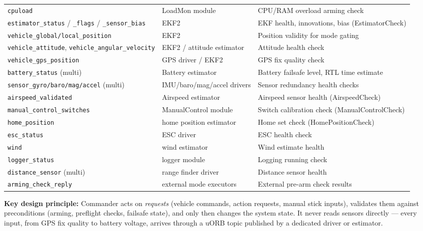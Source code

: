 \documentclass[12pt,a4paper]{article}
\begin{document}
\begin{center}
\begin{tabular}{p{4.5cm}p{3.5cm}p{5.5cm}}
\texttt{cpuload}
  & LoadMon module
  & CPU/RAM overload arming check \\
\texttt{estimator\_status} / \texttt{\_flags} / \texttt{\_sensor\_bias}
  & EKF2
  & EKF health, innovations, bias (EstimatorCheck) \\
\texttt{vehicle\_global/local\_position}
  & EKF2
  & Position validity for mode gating \\
\texttt{vehicle\_attitude}, \texttt{vehicle\_angular\_velocity}
  & EKF2 / attitude estimator
  & Attitude health check \\
\texttt{vehicle\_gps\_position}
  & GPS driver / EKF2
  & GPS fix quality check \\
\texttt{battery\_status} (multi)
  & Battery estimator
  & Battery failsafe level, RTL time estimate \\
\texttt{sensor\_gyro/baro/mag/accel} (multi)
  & IMU/baro/mag/accel drivers
  & Sensor redundancy health checks \\
\texttt{airspeed\_validated}
  & Airspeed estimator
  & Airspeed sensor health (AirspeedCheck) \\
\texttt{manual\_control\_switches}
  & ManualControl module
  & Switch calibration check (ManualControlCheck) \\
\texttt{home\_position}
  & home position estimator
  & Home set check (HomePositionCheck) \\
\texttt{esc\_status}
  & ESC driver
  & ESC health check \\
\texttt{wind}
  & wind estimator
  & Wind estimate health \\
\texttt{logger\_status}
  & logger module
  & Logging running check \\
\texttt{distance\_sensor} (multi)
  & range finder driver
  & Distance sensor health \\
\texttt{arming\_check\_reply}
  & external mode executors
  & External pre-arm check results \\
\bottomrule
\end{tabular}
\end{center}

\bigskip
\textbf{Key design principle:} Commander acts on \emph{requests} (vehicle commands,
action requests, manual stick inputs), validates them against preconditions
(arming, preflight checks, failsafe state), and only then changes the system state.
It never reads sensors directly — every input, from GPS fix quality to battery
voltage, arrives through a uORB topic published by a dedicated driver or estimator.
\end{document}
